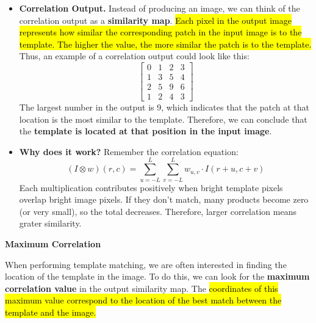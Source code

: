 \begin{itemize}
    \item[\textcolor{Green3}{\faIcon{map}}] \textcolor{Green3}{\textbf{Correlation Output.}} Instead of producing an image, we can think of the correlation output as a \textbf{similarity map}. \hl{Each pixel in the output image represents how similar the corresponding patch in the input image is to the template. The higher the value, the more similar the patch is to the template.} Thus, an example of a correlation output could look like this:
    \begin{equation*}
        \begin{bmatrix}
            0 & 1 & 2 & 3 \\
            1 & 3 & 5 & 4 \\
            2 & 5 & 9 & 6 \\
            1 & 2 & 4 & 3
        \end{bmatrix}
    \end{equation*}
    The largest number in the output is 9, which indicates that the patch at that location is the most similar to the template. Therefore, we can conclude that the \textbf{template is located at that position in the input image}.

    \item[\textcolor{Green3}{\faIcon{question-circle}}] \textcolor{Green3}{\textbf{Why does it work?}} Remember the correlation equation:
    \begin{equation*}
        \left(I \otimes w\right)\left(r,c\right) = \sum_{u=-L}^{L} \sum_{v=-L}^{L} w_{u,v} \cdot I\left(r+u, c+v\right)
    \end{equation*}
    Each multiplication contributes positively when bright template pixels overlap bright image pixels. If they don't match, many products become zero (or very small), so the total decreases. Therefore, larger correlation means grater similarity.
\end{itemize}

\highspace
\begin{flushleft}
    \textcolor{Red2}{ \textbf{Maximum Correlation}}
\end{flushleft}
When performing template matching, we are often interested in finding the location of the template in the image. To do this, we can look for the \textbf{maximum correlation value} in the output similarity map. The \hl{coordinates of this maximum value correspond to the location of the best match between the template and the image.}

